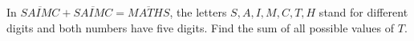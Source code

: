 In $\overline{SAIMC}+\overline{SAIMC}=\overline{MATHS}$, the letters $S,A,I,M,C,T,H$ stand for different digits and both numbers have five digits. Find the sum of all possible values of $T$.
